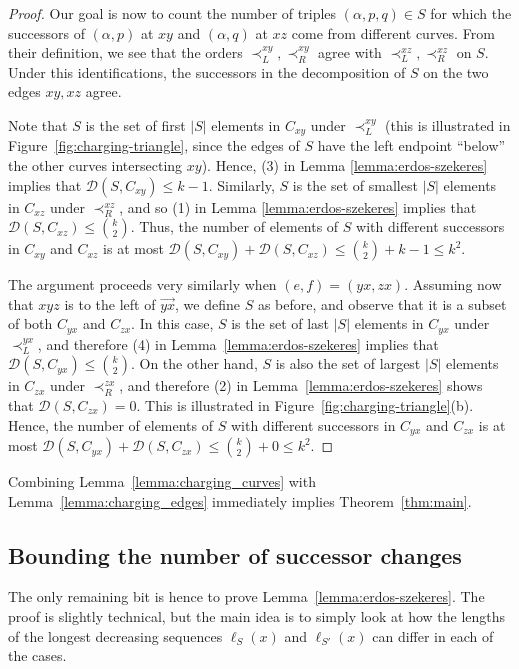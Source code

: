 \documentclass[11pt]{amsart}
\theoremstyle{definition}
\newcommand{\cD}{\mathcal{D}}
\begin{document}
\begin{proof}
Our goal is now to count the number of triples $(\alpha, p, q)\in S$ for which the successors of $(\alpha, p)$ at $xy$ and $(\alpha, q)$ at $xz$ come from different curves. From their definition, we see that the orders $\prec_L^{xy}, \prec_R^{xy}$ agree with $\prec_L^{xz}, \prec_R^{xz}$ on $S$. Under this identifications, the successors in the decomposition of $S$ on the two edges $xy, xz$ agree.

Note that $S$ is the set of first $|S|$ elements in $C_{xy}$ under $\prec_L^{xy}$ (this is illustrated in Figure~\ref{fig:charging-triangle}, since the edges of $S$ have the left endpoint ``below'' the other curves intersecting $xy$). Hence, (3) in Lemma \ref{lemma:erdos-szekeres} implies that $\cD(S,C_{xy})\leq k-1$. Similarly, $S$ is the set of smallest $|S|$ elements in $C_{xz}$ under $\prec_R^{xz}$, and so (1) in Lemma \ref{lemma:erdos-szekeres} implies that $\cD(S,C_{xz})\leq \binom{k}{2}$. Thus, the number of elements of $S$ with different successors in $C_{xy}$ and $C_{xz}$ is at most $\cD(S,C_{xy})+\cD(S,C_{xz})\leq \binom{k}{2}+k-1\leq k^2$.

The argument proceeds very similarly when $(e, f)=(yx, zx)$. Assuming now that $xyz$ is to the left of $\vec{yx}$, we define $S$ as before, and observe that it is a subset of both $C_{yx}$ and $C_{zx}$. In this case, $S$ is the set of last $|S|$ elements in $C_{yx}$ under $\prec_L^{yx}$, and therefore (4) in Lemma~\ref{lemma:erdos-szekeres} implies that $\cD(S, C_{yx})\leq \binom{k}{2}$. On the other hand, $S$ is also the set of largest $|S|$ elements in $C_{zx}$ under $\prec_R^{zx}$, and therefore (2) in Lemma~\ref{lemma:erdos-szekeres} shows that $\cD(S, C_{zx})=0$. This is illustrated in Figure~\ref{fig:charging-triangle}(b). Hence, the number of elements of $S$ with different successors in $C_{yx}$ and $C_{zx}$ is at most $\cD(S,C_{yx})+\cD(S,C_{zx})\leq \binom{k}{2}+0\leq k^2$.
\end{proof}

Combining Lemma~\ref{lemma:charging_curves} with Lemma~\ref{lemma:charging_edges} immediately implies Theorem~\ref{thm:main}.

\subsection{Bounding the number of successor changes}
The only remaining bit is hence to prove Lemma~\ref{lemma:erdos-szekeres}.
The proof is slightly technical, but the main idea is to simply look at how the lengths of the longest decreasing sequences $\ell_{S}(x)$ and $\ell_{S'}(x)$ can differ in each of the cases.
\end{document}
